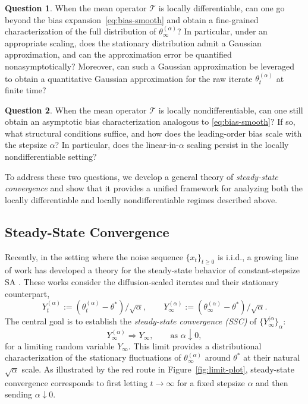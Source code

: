 \documentclass[11pt,letterpaper]{article}
\theoremstyle{plain}
\theoremstyle{definition}
\newtheorem{question}{Question}
\theoremstyle{remark}
\newcommand{\mT}{\mathcal{T}}
\begin{document}
\begin{question}\label{q:smooth}
When the mean operator $\mT$ is locally differentiable, can one go beyond the  bias expansion~\eqref{eq:bias-smooth} and obtain a fine-grained characterization of the full distribution of $\theta_\infty^{(\alpha)}$? In particular, under an appropriate scaling, does the stationary distribution admit a Gaussian approximation, and can the approximation error be quantified nonasymptotically? Moreover, can such a  Gaussian approximation be leveraged to obtain a quantitative Gaussian approximation for the raw iterate $\theta_t^{(\alpha)}$ at finite time?
\end{question}

\begin{question}\label{q:nonsmooth}
When the mean operator $\mT$ is locally nondifferentiable, can one still obtain an asymptotic bias characterization analogous to \eqref{eq:bias-smooth}? If so, what structural conditions suffice, and how does the leading-order bias scale with the stepsize $\alpha$? In particular, does the linear-in-$\alpha$ scaling persist in the locally nondifferentiable setting?
\end{question}


To address these two questions, we develop a general theory of
\emph{steady-state convergence} and show that it provides a unified framework for analyzing both the locally  differentiable and locally nondifferentiable regimes described above.
\subsection{Steady-State Convergence}

Recently, in the setting where the noise sequence $\{x_t\}_{t\ge 0}$ is
i.i.d., a growing line of work has developed a theory for the
steady-state behavior of constant-stepsize SA
\citep{chen2022stationary,zhang2024prelimit,wang2026steady}.
These works consider the diffusion-scaled iterates and their stationary
counterpart,
\[
Y_t^{(\alpha)} := (\theta_t^{(\alpha)}-\theta^*)/\sqrt{\alpha},
\qquad
Y_\infty^{(\alpha)} := (\theta_\infty^{(\alpha)}-\theta^*)/\sqrt{\alpha}.
\]
The central goal is to establish the \emph{steady-state convergence (SSC)} of $\{Y^{(\alpha}_{\infty}\}_{\alpha}$:
\[
    Y_\infty^{(\alpha)}
    \Rightarrow
    Y_\infty,
    \qquad
    \text{as } \alpha\downarrow 0,
\]
for a limiting random variable $Y_\infty$. This limit provides a
distributional characterization of the stationary fluctuations of
$\theta_\infty^{(\alpha)}$ around $\theta^*$ at their natural
$\sqrt{\alpha}$ scale. As illustrated by the red route in
Figure~\ref{fig:limit-plot}, steady-state convergence corresponds to first
letting $t\to\infty$ for a fixed stepsize $\alpha$ and then sending
$\alpha\downarrow0$.
\end{document}
